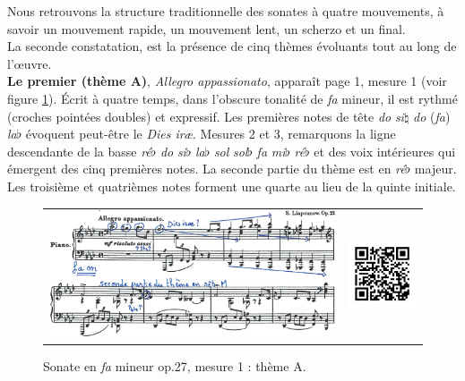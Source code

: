 Nous retrouvons la structure traditionnelle des sonates à quatre mouvements, à savoir un mouvement rapide, un mouvement lent, un scherzo et un final.\\

La seconde constatation, est la présence de cinq thèmes évoluants tout au long de l'œuvre.\\

\textbf{Le premier (thème A)}, \emph{Allegro appassionato}, apparaît page 1, mesure 1 (voir figure \ref{sonate-theme-1}). Écrit à quatre temps, dans l'obscure tonalité de \emph{fa} mineur, il est rythmé (croches pointées doubles) et expressif. Les premières notes de tête \emph{do} \emph{si}$\natural$ \emph{do} (\emph{fa}) \emph{la}$\flat$ évoquent peut-être le \emph{Dies iræ}. Mesures 2 et 3, remarquons la ligne descendante de la basse \emph{ré}$\flat$ \emph{do} \emph{si}$\flat$ \emph{la}$\flat$ \emph{sol} \emph{sol}$\flat$ \emph{fa} \emph{mi}$\flat$ \emph{ré}$\flat$ et des voix intérieures qui émergent des cinq premières notes. La seconde partie du thème est en \emph{ré}$\flat$ majeur. Les troisième et quatrièmes notes forment une quarte au lieu de la quinte initiale.

\begin{figure}[!ht]
  \begin{bigcenter}
    \vspace*{0.2cm}
    \begin{tabular}{lr}
      \includegraphics[width=12.5cm, keepaspectratio]{sonate-theme-A.png}
      &
      \includegraphics[width=3cm, keepaspectratio]{op1-qr.png}
    \end{tabular}
  \end{bigcenter}
  \caption{\label{sonate-theme-1}Sonate en \emph{fa} mineur op.27, mesure 1 : thème A.}
\end{figure}

